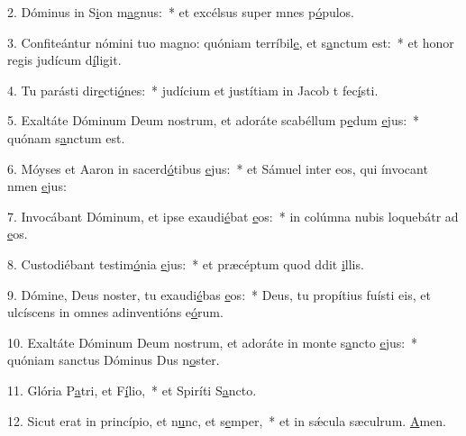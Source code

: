 2. Dóminus in S\uline{i}on m\uline{a}gnus:~* et excélsus super mnes p\uline{ó}pulos.\par 
3. Confiteántur nómini tuo magno: quóniam terríbil\uline{e}, et s\uline{a}nctum est:~* et honor regis judícum d\uline{í}ligit.\par 
4. Tu parásti dir\uline{e}cti\uline{ó}nes:~* judícium et justítiam in Jacob t fec\uline{í}sti.\par 
5. Exaltáte Dóminum Deum nostrum, et adoráte scabéllum p\uline{e}dum \uline{e}jus:~* quónam s\uline{a}nctum est.\par 
6. Móyses et Aaron in sacerd\uline{ó}tibus \uline{e}jus:~* et Sámuel inter eos, qui ínvocant nmen \uline{e}jus:\par 
7. Invocábant Dóminum, et ipse exaudi\uline{é}bat \uline{e}os:~* in colúmna nubis loquebátr ad \uline{e}os.\par 
8. Custodiébant testim\uline{ó}nia \uline{e}jus:~* et præcéptum quod ddit \uline{i}llis.\par 
9. Dómine, Deus noster, tu exaudi\uline{é}bas \uline{e}os:~* Deus, tu propítius fuísti eis, et ulcíscens in omnes adinventións e\uline{ó}rum.\par 
10. Exaltáte Dóminum Deum nostrum, et adoráte in monte s\uline{a}ncto \uline{e}jus:~* quóniam sanctus Dóminus Dus n\uline{o}ster.\par 
11. Glória P\uline{a}tri, et F\uline{í}lio,~* et Spiríti S\uline{a}ncto.\par 
12. Sicut erat in princípio, et n\uline{u}nc, et s\uline{e}mper,~* et in sǽcula sæculrum. \uline{A}men.\par 
